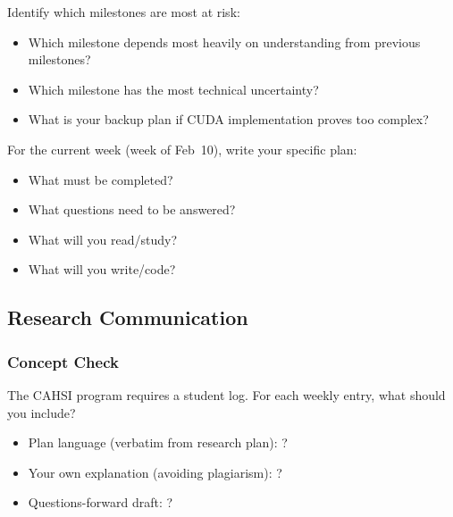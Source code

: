 Identify which milestones are most at risk:
\begin{itemize}[nosep]
  \item Which milestone depends most heavily on understanding from previous milestones?
  \item Which milestone has the most technical uncertainty?
  \item What is your backup plan if CUDA implementation proves too complex?
\end{itemize}

\begin{answerbox}\end{answerbox}

For the current week (week of Feb~10), write your specific plan:
\begin{itemize}[nosep]
  \item What must be completed?
  \item What questions need to be answered?
  \item What will you read/study?
  \item What will you write/code?
\end{itemize}

\begin{answerbox}\end{answerbox}

\subsection{Research Communication}

\subsubsection*{Concept Check}

The CAHSI program requires a student log. For each weekly entry, what should you include?
\begin{itemize}[nosep]
  \item Plan language (verbatim from research plan): ?
  \item Your own explanation (avoiding plagiarism): ?
  \item Questions-forward draft: ?
\end{itemize}

\begin{answerbox}\end{answerbox}


